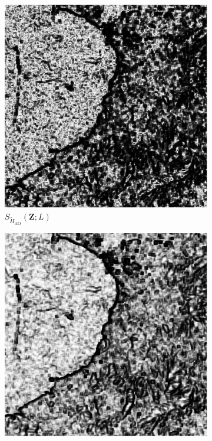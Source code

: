\begin{figure}[H]
  \centering
  \begin{subfigure}[b]{0.3\textwidth}
    \centering
    \includegraphics[width=\textwidth]{../../Figures/PNG/H_pvalue_Mexico_512_18L_AO_200b}
    \caption{$S_{\widetilde{H}_{\text{AO}}}(\bm{Z}; L)$}
    \label{fig:Mexico_pvalue-1}
  \end{subfigure}
  \hfill
  \begin{subfigure}[b]{0.3\textwidth}
    \centering
    \includegraphics[width=\textwidth]{../../Figures/PNG/cv_pvalues_mexico_512}

\end{subfigure}
\end{figure}
